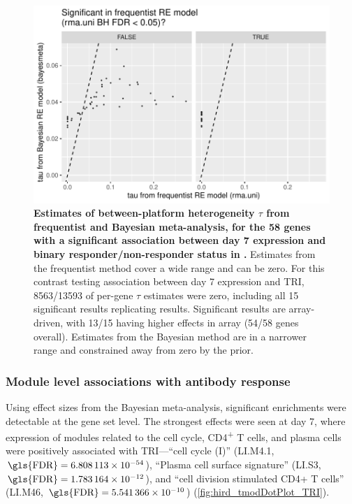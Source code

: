 \begin{figure}
    \includegraphics[width=1.0\textwidth,page=1]{mainmatter/figures/chapter_02/plot_dge_eqtl.DGE.sobolev2016_d7R.vs.d7NR.tauComparison.pdf}
    \caption{
        \textbf{Estimates of between-platform heterogeneity $\tau$ from frequentist and Bayesian meta-analysis, for the 58 genes with a significant association between day 7 expression and binary responder/non-responder status in \textcite{sobolev2016AdjuvantedInfluenzaH1N1Vaccination}.}
        Estimates from the frequentist method cover a wide range and can be zero.
        For this contrast testing association between day 7 expression and \gls{TRI}, \num{8563/13593} of per-gene $\tau$ estimates were zero,
        including all 15 significant results replicating \autocite{sobolev2016AdjuvantedInfluenzaH1N1Vaccination} results.
        Significant results are array-driven, with 13/15 having higher effects in array (54/58 genes overall).
        Estimates from the Bayesian method are in a narrower range and constrained away from zero by the prior.
    }
    \label{fig:hird_DGE_sobolev2016hits_tauComparison}
\end{figure}

\subsubsection{Module level associations with antibody response}

Using effect sizes from the Bayesian meta-analysis,
significant enrichments were detectable at the gene set level.
The strongest effects were seen at day 7, where expression of modules related to the cell cycle, CD4\textsuperscript{+} T cells, and plasma cells were positively associated with \gls{TRI}---\enquote{cell cycle (I)} (LI.M4.1, $\text{\gls{FDR}} = \num{6.808113e-54}$),
\enquote{Plasma cell surface signature} (LI.S3, $\text{\gls{FDR}} = \num{1.783164e-12}$),
and \enquote{cell division stimulated CD4+ T cells} (LI.M46, $\text{\gls{FDR}} = \num{5.541366e-10}$) (\cref{fig:hird_tmodDotPlot_TRI}).

